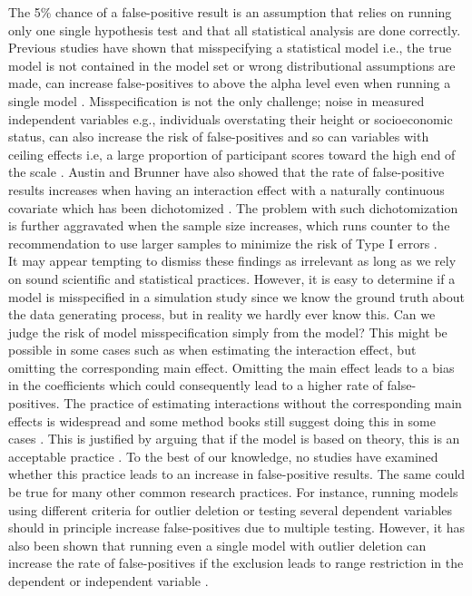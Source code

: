 The 5\% chance of a false-positive result is an assumption that relies on running only one single hypothesis test and that all statistical analysis are done correctly. Previous studies have shown that misspecifying a statistical model i.e., the true model is not contained in the model set or wrong distributional assumptions are made, can increase false-positives to above the alpha level even when running a single model \citep{Dennis2019,litiere2007type}. Misspecification is not the only challenge; noise in measured independent variables e.g., individuals overstating their height or socioeconomic status, can also increase the risk of false-positives \citep{Brunner2009} and so can variables with ceiling effects i.e, a large proportion of participant scores toward the high end of the scale \citep{Austin2003}. Austin and Brunner have also showed that the rate of false-positive results increases when having an interaction effect with a naturally continuous covariate which has been dichotomized \citep{Austin2004}. The problem with such dichotomization is further aggravated when the sample size increases, which runs counter to the recommendation to use larger samples to minimize the risk of Type I errors \citep{simmons2018}. 
\\
It may appear tempting to dismiss these findings as irrelevant as long as we rely on sound scientific and statistical practices. However, it is easy to determine if a model is misspecified in a simulation study since we know the ground truth about the data generating process, but in reality we hardly ever know this. Can we judge the risk of model misspecification simply from the model? This might be possible in some cases such as when estimating the interaction effect, but omitting the corresponding main effect. Omitting the main effect leads to a bias in the coefficients \citep{Branbor2006} which could consequently lead to a higher rate of false-positives. The practice of estimating interactions without the corresponding main effects is widespread \citep{Branbor2006} and some method books still suggest doing this in some cases \citep{Cleves2008}. This is justified by arguing that if the model is based on theory, this is an acceptable practice \citep{aiken1991multiple}. To the best of our knowledge, no studies have examined whether this practice leads to an increase in false-positive results. The same could be true for many other common research practices. For instance, running models using different criteria for outlier deletion or testing several dependent variables should in principle increase false-positives due to multiple testing. However, it has also been shown that running even a single model with outlier deletion can increase the rate of false-positives if the exclusion leads to range restriction in the dependent or independent variable \citep{Raju2003}. \\        

